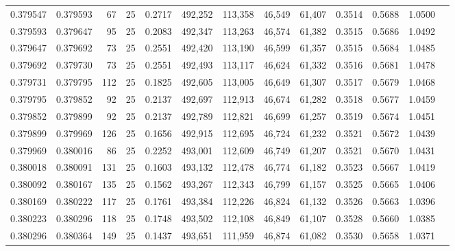 \begin{tabular}{rrrrrrrrrrrrr}
0.379547 & 0.379593 &    67 &  25 &                                     0.2717 & 492,252 & 113,358 &  46,549 &  61,407 & 0.3514 & 0.5688 & 1.0500 \\
0.379593 & 0.379647 &    95 &  25 &                                     0.2083 & 492,347 & 113,263 &  46,574 &  61,382 & 0.3515 & 0.5686 & 1.0492 \\
0.379647 & 0.379692 &    73 &  25 &                                     0.2551 & 492,420 & 113,190 &  46,599 &  61,357 & 0.3515 & 0.5684 & 1.0485 \\
0.379692 & 0.379730 &    73 &  25 &                                     0.2551 & 492,493 & 113,117 &  46,624 &  61,332 & 0.3516 & 0.5681 & 1.0478 \\
0.379731 & 0.379795 &   112 &  25 &                                     0.1825 & 492,605 & 113,005 &  46,649 &  61,307 & 0.3517 & 0.5679 & 1.0468 \\
0.379795 & 0.379852 &    92 &  25 &                                     0.2137 & 492,697 & 112,913 &  46,674 &  61,282 & 0.3518 & 0.5677 & 1.0459 \\
0.379852 & 0.379899 &    92 &  25 &                                     0.2137 & 492,789 & 112,821 &  46,699 &  61,257 & 0.3519 & 0.5674 & 1.0451 \\
0.379899 & 0.379969 &   126 &  25 &                                     0.1656 & 492,915 & 112,695 &  46,724 &  61,232 & 0.3521 & 0.5672 & 1.0439 \\
0.379969 & 0.380016 &    86 &  25 &                                     0.2252 & 493,001 & 112,609 &  46,749 &  61,207 & 0.3521 & 0.5670 & 1.0431 \\
0.380018 & 0.380091 &   131 &  25 &                                     0.1603 & 493,132 & 112,478 &  46,774 &  61,182 & 0.3523 & 0.5667 & 1.0419 \\
0.380092 & 0.380167 &   135 &  25 &                                     0.1562 & 493,267 & 112,343 &  46,799 &  61,157 & 0.3525 & 0.5665 & 1.0406 \\
0.380169 & 0.380222 &   117 &  25 &                                     0.1761 & 493,384 & 112,226 &  46,824 &  61,132 & 0.3526 & 0.5663 & 1.0396 \\
0.380223 & 0.380296 &   118 &  25 &                                     0.1748 & 493,502 & 112,108 &  46,849 &  61,107 & 0.3528 & 0.5660 & 1.0385 \\
0.380296 & 0.380364 &   149 &  25 &                                     0.1437 & 493,651 & 111,959 &  46,874 &  61,082 & 0.3530 & 0.5658 & 1.0371 \\

\end{tabular}
